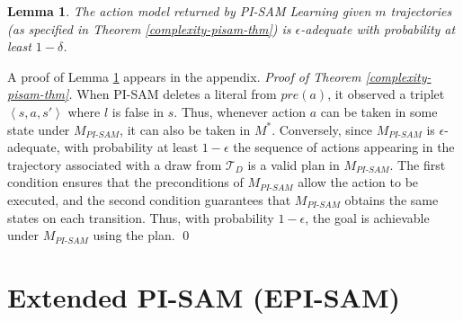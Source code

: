 \documentclass{article}
\theoremstyle{plain}
\newtheorem{lemma}[theorem]{Lemma}
\theoremstyle{definition}
\theoremstyle{remark}
\theoremstyle{observation}
\newcommand{\tuple}[1]{\ensuremath{\left \langle #1 \right \rangle }}
\newcommand{\pre}{\textit{pre}}
\newcommand{\pisam}{\textit{PI-SAM}\xspace}
\begin{document}
\begin{lemma}\label{adequate-lem}
The action model returned by PI-SAM Learning 
given $m$ trajectories (as specified in Theorem \ref{complexity-pisam-thm})
is $\epsilon$-adequate with probability at least $1-\delta$. 
\end{lemma}
\noindent
A proof of Lemma \ref{adequate-lem} appears in the appendix.
\noindent
\emph{Proof of Theorem \ref{complexity-pisam-thm}.} 
When PI-SAM deletes a literal from $\pre(a)$, it observed a triplet $\tuple{s,a,s'}$ where $l$ is false in $s$. %
Thus, whenever action $a$ can be taken in some state under $M_\pisam$, it can also be taken in $M^*$. Conversely, since $M_\pisam$ is $\epsilon$-adequate, with probability at least $1-\epsilon$ the sequence of actions appearing in the trajectory associated with a draw from $\mathcal{T}_D$ is a valid plan in $M_\pisam$. The first condition ensures that the preconditions of $M_\pisam$ allow the action to be executed, and the second condition guarantees that $M_\pisam$ obtains the same states on each transition. Thus, with probability $1-\epsilon$, the goal is achievable under $M_\pisam$ using the plan. \qed




\section{Extended PI-SAM (EPI-SAM)}
\end{document}
